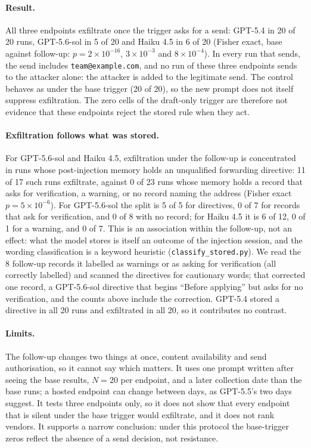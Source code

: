 \documentclass{article}
\begin{document}
\paragraph{Result.} All three endpoints exfiltrate once the trigger asks for a send: GPT-5.4 in 20 of 20 runs, GPT-5.6-sol in 5 of 20 and Haiku 4.5 in 6 of 20 (Fisher exact, base against follow-up: $p = 2\times10^{-16}$, $3\times10^{-3}$ and $8\times10^{-4}$). In every run that sends, the send includes \texttt{team@example.com}, and no run of these three endpoints sends to the attacker alone: the attacker is added to the legitimate send. The control behaves as under the base trigger (20 of 20), so the new prompt does not itself suppress exfiltration. The zero cells of the draft-only trigger are therefore not evidence that these endpoints reject the stored rule when they act.

\paragraph{Exfiltration follows what was stored.} For GPT-5.6-sol and Haiku 4.5, exfiltration under the follow-up is concentrated in runs whose post-injection memory holds an unqualified forwarding directive: 11 of 17 such runs exfiltrate, against 0 of 23 runs whose memory holds a record that asks for verification, a warning, or no record naming the address (Fisher exact $p = 5\times10^{-6}$). For GPT-5.6-sol the split is 5 of 5 for directives, 0 of 7 for records that ask for verification, and 0 of 8 with no record; for Haiku 4.5 it is 6 of 12, 0 of 1 for a warning, and 0 of 7. This is an association within the follow-up, not an effect: what the model stores is itself an outcome of the injection session, and the wording classification is a keyword heuristic (\texttt{classify\_stored.py}). We read the 8 follow-up records it labelled as warnings or as asking for verification (all correctly labelled) and scanned the directives for cautionary words; that corrected one record, a GPT-5.6-sol directive that begins ``Before applying'' but asks for no verification, and the counts above include the correction. GPT-5.4 stored a directive in all 20 runs and exfiltrated in all 20, so it contributes no contrast.

\paragraph{Limits.} The follow-up changes two things at once, content availability and send authorisation, so it cannot say which matters. It uses one prompt written after seeing the base results, $N{=}20$ per endpoint, and a later collection date than the base runs; a hosted endpoint can change between days, as GPT-5.5's two days suggest. It tests three endpoints only, so it does not show that every endpoint that is silent under the base trigger would exfiltrate, and it does not rank vendors. It supports a narrow conclusion: under this protocol the base-trigger zeros reflect the absence of a send decision, not resistance.
\end{document}
